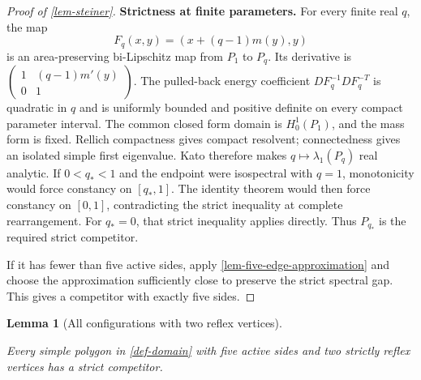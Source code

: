 \documentclass[11pt,a4paper]{article}
\theoremstyle{proofmanuscript}
\newtheorem{lemma}[theorem]{Lemma}
\begin{document}
\begin{proof}[Proof of \ref{lem-steiner}]
\textbf{Strictness at finite parameters.} For every finite real \(q\), the map \[
F_q(x,y)=(x+(q-1)m(y),y)\tag{G.3.6}
\] is an area-preserving bi-Lipschitz map from \(P_1\) to \(P_q\). Its derivative is \(\left(\begin{smallmatrix}1&(q-1)m'(y)\\0&1\end{smallmatrix}\right)\). The pulled-back energy coefficient \(DF_q^{-1}DF_q^{-T}\) is quadratic in \(q\) and is uniformly bounded and positive definite on every compact parameter interval. The common closed form domain is \(H_0^1(P_1)\), and the mass form is fixed. Rellich compactness gives compact resolvent; connectedness gives an isolated simple first eigenvalue. Kato \cite{nc:kato} therefore makes \(q\mapsto\lambda_1(P_q)\) real analytic. If \(0<q_*<1\) and the endpoint were isospectral with \(q=1\), monotonicity would force constancy on \([q_*,1]\). The identity theorem would then force constancy on \([0,1]\), contradicting the strict inequality at complete rearrangement. For \(q_*=0\), that strict inequality applies directly. Thus \(P_{q_*}\) is the required strict competitor.

If it has fewer than five active sides, apply \ref{lem-five-edge-approximation} and choose the approximation sufficiently close to preserve the strict spectral gap. This gives a competitor with exactly five sides.

\end{proof}

\begin{lemma}[All configurations with two reflex vertices]\label{lem-double}

Every simple polygon in \ref{def-domain} with five active sides and two strictly reflex vertices has a strict competitor.

\end{lemma}
\end{document}

